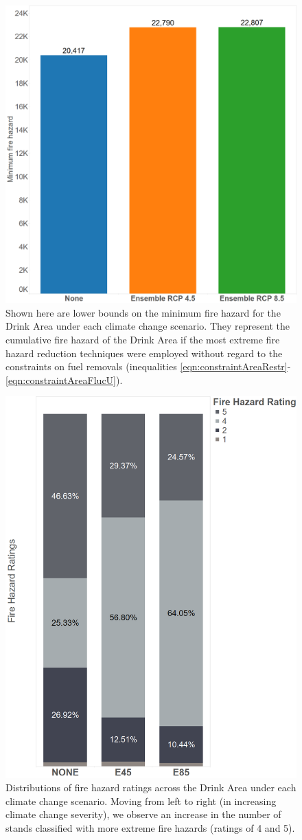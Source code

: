 \begin{figure}[ht]
\centering
\includegraphics[width=.40\textwidth]{../images/CumSmallestFireHazard}
\caption[Lower bound on fire hazard for each climate scenario]{Shown here are lower bounds on the minimum fire hazard for the Drink Area under each climate change scenario. They represent the cumulative fire hazard of the Drink Area if the most extreme fire hazard reduction techniques were employed without regard to the constraints on fuel removals (inequalities \eqref{eqn:constraintAreaRestr}-\eqref{eqn:constraintAreaFlucU}).}
\label{fig:distOfFireHazards}
\end{figure}

\begin{figure}[ht]
\centering
\includegraphics[width=.5\textwidth]{../images/FireHazardRatingsPerClimateScenario}
\caption[Distribution of fire hazard ratings over the Drink Area for each climate change scenario]{Distributions of fire hazard ratings across the Drink Area under each climate change scenario. Moving from left to right (in increasing climate change severity), we observe an increase in the number of stands classified with more extreme fire hazards (ratings of 4 and 5).}
\label{fig:cumSmallestFireHazard}
\end{figure}

